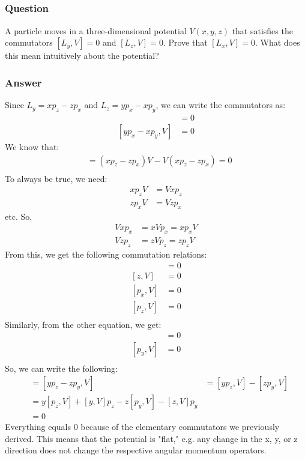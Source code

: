 \documentclass[12pt]{article}
\begin{document}
\subsection{}
\subsubsection{Question}
A particle moves in a three-dimensional potential $V(x,y,z)$ that satisfies the commutators $[L_y,V]=0$ and $[L_z,V]=0$. Prove that $[L_x,V]=0$. What does this mean intuitively about the potential?
\subsubsection{Answer}
Since $L_y= xp_z-zp_x$ and $L_z=yp_x-xp_y$, we can write the commutators as:
\begin{align*}
[xp_z-zp_x,V] &= 0\\
[yp_x-xp_y,V] &= 0
\end{align*}
We know that:
\begin{align*}
[xp_z-zp_x,V] &= (xp_z-zp_x)V - V(xp_z-zp_x) = 0\\
\end{align*}
To always be true, we need:
\begin{align*}
xp_zV &= Vxp_z\\
zp_xV &= Vzp_x
\end{align*}
etc. So,
\begin{align*}
Vxp_x &= xVp_x=xp_xV\\
Vzp_z &= zVp_z=zp_zV
\end{align*}
From this, we get the following commutation relations:
\begin{align*}
[x,V]&=0\\
[z,V]&=0\\
[p_x,V]&=0\\
[p_z,V]&=0\\
\end{align*}
Similarly, from the other equation, we get:
\begin{align*}
[y,V]&=0\\
[p_y,V]&=0\\
\end{align*}
So, we can write the following:
\begin{align*}
[L_x, V] &= [yp_z-zp_y, V] &= [yp_z, V]-[zp_y,V]\\
&= y[p_z,V]+[y,V]p_z - z[p_y,V]-[z,V]p_y\\
&= 0
\end{align*}
Everything equals 0 because of the elementary commutators we previously derived.
This means that the potential is "flat," e.g. any change in the x, y, or z direction does not change the respective angular momentum operators.
\end{document}
